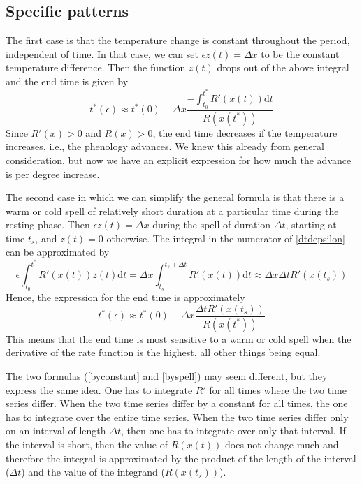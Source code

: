 \documentclass[12 pt]{article}
\begin{document}
\subsection*{Specific patterns}
The first case is that the temperature change is constant throughout the period, independent of time. In that case, we can set $\epsilon z(t)=\Delta x$ to be the constant temperature difference. Then the function $z(t)$ drops out of the above integral and the end time is given by
\begin{equation}\label{byconstant}
    t^*(\epsilon) \approx t^*(0) - \Delta x \frac{- \int _{t_0} ^{t^*} R'(x(t)) \mathrm{d}t}{R(x(t^*))} \tag*{Eq. S\theequation}
\end{equation}
Since $R'(x)>0$ and $R(x)>0$, the end time decreases if the temperature increases, i.e., the phenology advances. We knew this already from general consideration, but now we have an explicit expression for how much the advance is per degree increase. \par

The second case in which we can simplify the general formula is that there is a warm or cold spell of relatively short duration at a particular time during the resting phase. Then $\epsilon z(t)=\Delta x$ during the spell of duration $\Delta t$, starting at time $t_s$, and $z(t)=0$ otherwise. The integral in the numerator of \ref{dtdepsilon} can be approximated by
\begin{equation}
    \epsilon \int _{t_0} ^{t^*} R'(x(t)) z(t) \mathrm{d}t = \Delta x \int _{t_s} ^{t_s + \Delta t}R'(x(t)) \mathrm{d}t \approx \Delta x \Delta t R'(x(t_s)) \tag*{Eq. S\theequation}
\end{equation}
Hence, the expression for the end time is approximately
\begin{equation}\label{byspell}
    t^*(\epsilon) \approx t^*(0)-\Delta x \frac{\Delta t R'(x(t_s))}{R(x(t^*))} \tag*{Eq. S\theequation}
\end{equation}
This means that the end time is most sensitive to a warm or cold spell when the derivative of the rate function is the highest, all other things being equal. \par
The two formulas (\ref{byconstant} and \ref{byspell}) may seem different, but they express the same idea. One has to integrate $R'$ for all times where the two time series differ. When the two time series differ by a constant for all times, the one has to integrate over the entire time series. When the two time series differ only on an interval of length $\Delta t$, then one has to integrate over only that interval. If the interval is short, then the value of $R(x(t))$ does not change much and therefore the integral is approximated by the product of the length of the interval ($\Delta t$) and the value of the integrand ($R(x(t_s))$). 
\end{document}
